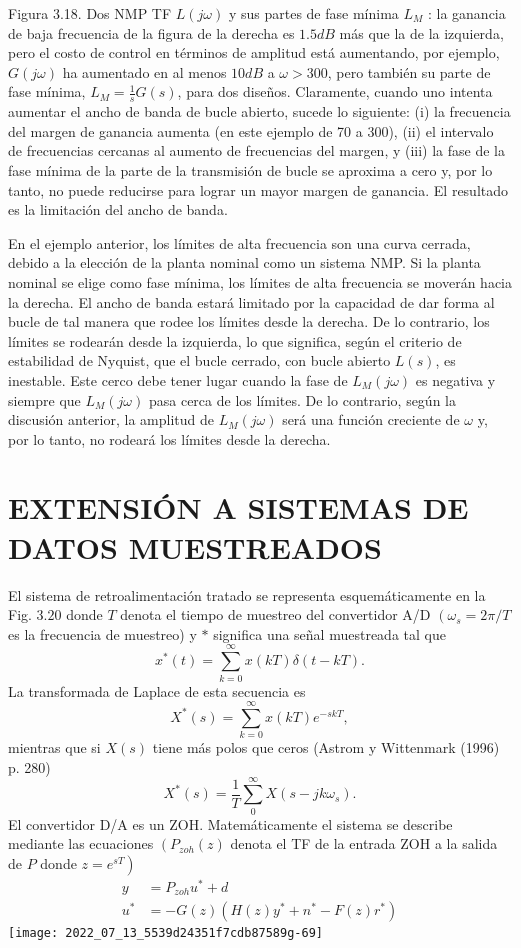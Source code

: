 Figura 3.18. Dos NMP TF $L(j \omega)$ y sus partes de fase mínima $L_{M}$ : la ganancia de baja frecuencia de la figura de la derecha es $1.5 d B$ más que la de la izquierda, pero el costo de control en términos de amplitud está aumentando, por ejemplo, $G(j \omega)$ ha aumentado en al menos $10 d B$ a $\omega>300$, pero también su parte de fase mínima,  $L_{M}=\frac{1}{s} G(s)$, para dos diseños. Claramente, cuando uno intenta aumentar el ancho de banda de bucle abierto, sucede lo siguiente: (i) la frecuencia del margen de ganancia aumenta (en este ejemplo de 70 a 300), (ii) el intervalo de frecuencias cercanas al aumento de frecuencias del margen, y (iii) la fase de la fase mínima de la parte de la transmisión de bucle se aproxima a cero y, por lo tanto, no puede reducirse para lograr un mayor margen de ganancia. El resultado es la limitación del ancho de banda.

En el ejemplo anterior, los límites de alta frecuencia son una curva cerrada, debido a la elección de la planta nominal como un sistema NMP. Si la planta nominal se elige como fase mínima, los límites de alta frecuencia se moverán hacia la derecha. El ancho de banda estará limitado por la capacidad de dar forma al bucle de tal manera que rodee los límites desde la derecha. De lo contrario, los límites se rodearán desde la izquierda, lo que significa, según el criterio de estabilidad de Nyquist, que el bucle cerrado, con bucle abierto $L(s)$, es inestable. Este cerco debe tener lugar cuando la fase de $L_{M}(j \omega)$ es negativa y siempre que $L_{M}(j \omega)$ pasa cerca de los límites. De lo contrario, según la discusión anterior, la amplitud de $L_{M}(j \omega)$ será una función creciente de $\omega$ y, por lo tanto, no rodeará los límites desde la derecha.

\section{EXTENSIÓN A SISTEMAS DE DATOS MUESTREADOS}
El sistema de retroalimentación tratado se representa esquemáticamente en la Fig. $3.20$ donde $T$ denota el tiempo de muestreo del convertidor A/D $\left(\omega_{s}=2 \pi / T\right.$ es la frecuencia de muestreo) y $*$ significa una señal muestreada tal que
$$
x^{*}(t)=\sum_{k=0}^{\infty} x(k T) \delta(t-k T) .
$$
La transformada de Laplace de esta secuencia es
$$
X^{*}(s)=\sum_{k=0}^{\infty} x(k T) e^{-s k T},
$$
mientras que si $X(s)$ tiene más polos que ceros (Astrom y Wittenmark (1996) p. 280)
$$
X^{*}(s)=\frac{1}{T} \sum_{0}^{\infty} X\left(s-j k \omega_{s}\right) .
$$
El convertidor D/A es un $\mathrm{ZOH}$. Matemáticamente el sistema se describe mediante las ecuaciones $\left(P_{z o h}(z)\right.$ denota el TF de la entrada $\mathrm{ZOH}$ a la salida de $P$ donde $\left.z=e^{s T}\right)$
$$
\begin{aligned}
y &=P_{z o h} u^{*}+d \\
u^{*} &=-G(z)\left(H(z) y^{*}+n^{*}-F(z) r^{*}\right)
\end{aligned}
$$
\texttt{[image: 2022\_07\_13\_5539d24351f7cdb87589g-69]}

